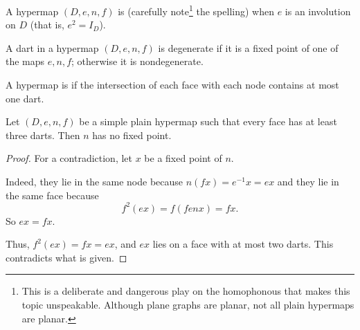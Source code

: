\begin{definition}[plain]
   A hypermap $(D,e,n,f)$ is
   (carefully note\footnote{This is a deliberate and
    dangerous play on the homophonous  that makes this
    topic unspeakable.  Although plane graphs are planar, not all
    plain hypermaps are planar.}  the spelling) when $e$ is an
  involution on $D$ (that is, $e^2 = I_D$).  %
\end{definition}




\begin{definition}[degenerate]
 A dart in a hypermap $(D,e,n,f)$ 
is degenerate if it is a
fixed point of one of the maps $e,n,f$; otherwise it is nondegenerate.  
%
%
\end{definition}

\begin{definition}[simple] 
A hypermap is  if the intersection of each face with
each node contains at most one dart.  %
\end{definition}


\begin{lemma}\label{lemma:nondegen} 
  Let $(D,e,n,f)$ be a simple plain hypermap such that every face has
  at least three darts.  Then $n$ has no fixed point.
\end{lemma}

\begin{proof} For a contradiction, let $x$ be a fixed point of
$n$. 

  Indeed, they lie in the same node
because $n(f x) = e^{-1} x = e x$ and they lie in the same face because
\[ f^2 (e x) = f (f e n x) = f x.\]  So
$e x = f x$.

Thus, $f^2 (e x) = f x = e x$, and $e x$ lies on a face with at most
two darts.  This contradicts what is given.
\end{proof}




